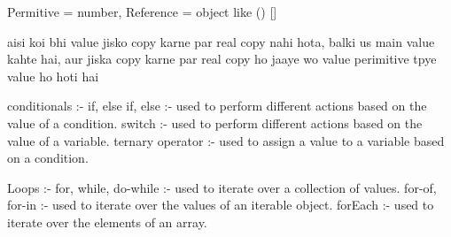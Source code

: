 Permitive = number,
Reference = object like () [] {} 

aisi koi bhi value jisko copy karne par real copy nahi hota, balki us main value kahte hai, aur jiska copy karne par real copy ho jaaye wo value perimitive tpye value ho hoti hai 

conditionals :- 
if, else if, else :- used to perform different actions based on the value of a condition.
switch :- used to perform different actions based on the value of a variable.
ternary operator :- used to assign a value to a variable based on a condition.

Loops :- 
for, while, do-while :- used to iterate over a collection of values.
for-of, for-in :- used to iterate over the values of an iterable object.
forEach :- used to iterate over the elements of an array.
